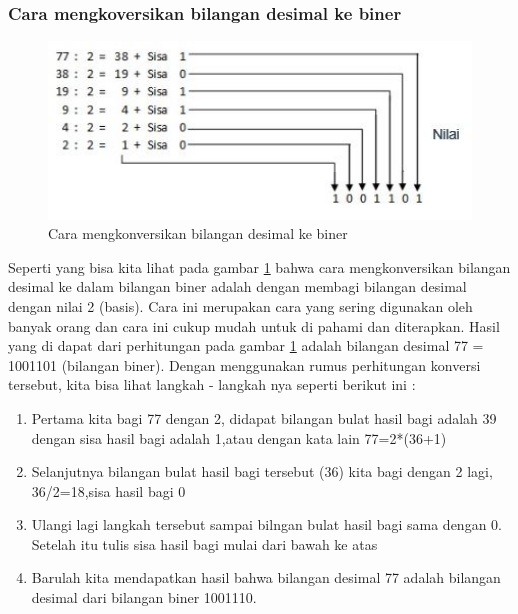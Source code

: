 \subsubsection{Cara mengkoversikan bilangan desimal ke biner}
\begin{figure}[ht]
\centerline{\includegraphics[width=1\textwidth]{figures/konversibiner.JPG}}
\caption{Cara mengkonversikan bilangan desimal ke biner}
\label{konversibiner}
\end{figure}
Seperti yang bisa kita lihat pada gambar \ref{konversibiner} bahwa cara mengkonversikan bilangan desimal ke dalam bilangan biner adalah dengan membagi bilangan desimal dengan nilai 2 (basis). Cara ini merupakan cara yang sering digunakan oleh banyak orang dan cara ini cukup mudah untuk di pahami dan diterapkan. Hasil yang di dapat dari perhitungan pada gambar \ref{konversibiner} adalah bilangan desimal 77 = 1001101 (bilangan biner). Dengan menggunakan rumus perhitungan konversi tersebut, kita bisa lihat langkah - langkah nya seperti berikut ini : 
\begin{enumerate}
\item Pertama kita bagi 77 dengan 2, didapat bilangan bulat hasil bagi adalah 39 dengan sisa hasil bagi adalah 1,atau dengan kata lain 77=2*(36+1)
\item Selanjutnya bilangan bulat hasil bagi tersebut (36) kita bagi dengan 2 lagi, 36/2=18,sisa hasil bagi 0
\item Ulangi lagi langkah tersebut sampai bilngan bulat hasil bagi sama dengan 0. Setelah itu tulis sisa hasil bagi mulai dari bawah ke atas
\item Barulah kita mendapatkan hasil bahwa bilangan desimal 77 adalah bilangan desimal dari bilangan biner 1001110.
\end{enumerate}

